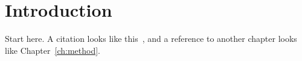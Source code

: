 \chapter{Introduction}
\label{ch:introduction}

Start here.  A citation looks like this~\parencite{knuth1984}, and a
reference to another chapter looks like Chapter~\ref{ch:method}.
